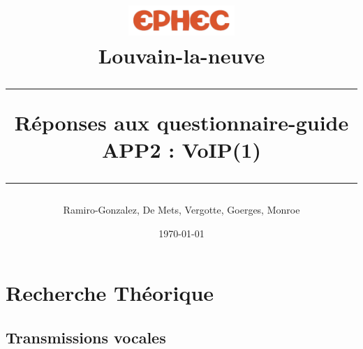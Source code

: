 \documentclass[a4paper,10pt,final,fleqn]{article}
\title{
\parbox{15cm}
{\includegraphics[width=4cm]{ephec.png} \\ 
  Louvain-la-neuve\\
    \vspace{3cm}
	\begin{center}\sf\bfseries\Huge
		\rule{15cm}{1pt}
		\medskip
		Réponses aux questionnaire-guide \\
		\huge APP2 : VoIP(1)\\
		\vspace{.5cm}
		\rule{15cm}{1pt}
	\end{center}
	\vspace{3cm}
}}
\author{Ramiro-Gonzalez, De Mets, Vergotte, Goerges, Monroe} \date{\today}
\begin{document}
\thispagestyle{empty}

\maketitle

\newpage

\section{Recherche Théorique}
	
	\subsection{Transmissions vocales}
		
		\begin{description}[style=nextline]


\end{description}
\end{document}
